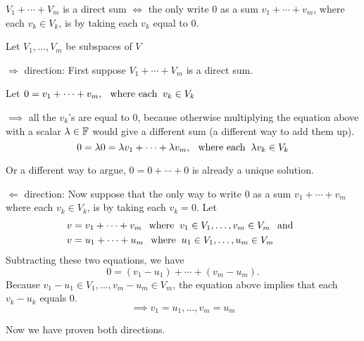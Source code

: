 \setcounter{thm}{44}
\begin{thm} 
  \label{thm: condition for a direct sum}
  $V_1 + \cdots + V_m$ is a direct sum $\iff$ the only write $0$ as a sum $v_1 + \cdots + v_m$, where each $v_k \in V_k$, is by taking each $v_k$ equal to $0$.
\end{thm}
\begin{prf} Let  $V_1, \ldots, V_m$ be subspaces of $V$ 
  \begin{description}
    \item{$\Rightarrow$ direction:} First suppose $V_1 + \cdots + V_m$ is a direct sum. 

    Let $0 = v_1 + \cdots + v_m, \;\;\, \text{where each}\;\; v_k \in V_k $
    
    $\implies$ all the $v_k$'s are equal to $0$, because otherwise multiplying the equation above with a scalar $\lambda \in \mathbb{F}$ would give a different sum (a different way to add them up).
    \begin{equation}
      0 = \lambda0= \lambda v_1 + \cdots + \lambda v_m, \;\;\, \text{where each}\;\; \lambda v_k \in V_k
    \end{equation}
    
    Or a different way to argue, $0 = 0 + \cdots + 0$ is already a unique solution. 
    
    \item{$\Leftarrow$ direction:} Now suppose that the only way to write $0$ as a sum $v_1 + \cdots + v_m$ where each $v_k \in V_k$, is by taking each $v_k = 0$. Let
    \begin{equation}
      \begin{aligned}
        v&=v_1 + \cdots + v_m \;\;\, \text{where}\;\; v_1 \in V_1, \ldots, v_m \in V_m \;\;\, \text{and}\;\; \\
        v&=u_1 + \cdots + u_m  \;\;\, \text{where}\;\; u_1 \in V_1, \ldots, u_m \in V_m
      \end{aligned}
    \end{equation}
    Subtracting these two equations, we have
    \begin{equation}
      0=(v_1-u_1)+\cdots+(v_m-u_m).
    \end{equation}
    Because $v_1 - u_1 \in V_1, \ldots, v_m - u_m \in V_m$, the equation above implies that each $v_k -u_k$ equals $0$.
    \begin{equation}
      \implies v_1=u_1, \ldots, v_m=u_m
    \end{equation}
  \end{description}
  Now we have proven both directions.
\end{prf}

